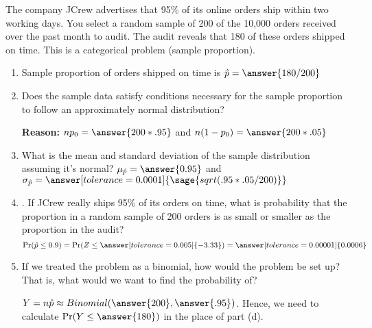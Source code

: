 \documentclass{ximera}
\begin{document}
\begin{problem}
The company JCrew advertises that 95\% of its online orders ship within two working
days. You select a random sample of 200 of the 10,000 orders received over the past month to
audit. The audit reveals that 180 of these orders shipped on time. This is a categorical problem
(sample proportion).
\begin{enumerate} 
    \item Sample proportion of orders shipped on time is $\hat p=\answer{180/200}$

    \item Does the sample data satisfy conditions necessary for the sample proportion to follow an
approximately normal distribution?
\begin{multipleChoice}
\end{multipleChoice}
{\bf Reason:} $np_0=\answer{200*.95}$
and $n(1-p_0)=\answer{200*.05}$
    
    \item What is the mean and standard deviation of the sample distribution assuming it's normal?
    $\mu_{\hat p}=\answer{0.95}$ and $\sigma_{\hat p}=\answer[tolerance=0.0001]{\sage{sqrt(.95*.05/200)}}$

    \item . If JCrew really ships 95\% of its orders on time, what is probability that the proportion in a
random sample of 200 orders is as small or smaller as the proportion in the audit?
$$\Pr(\hat p \leq 0.9)=\Pr(Z\leq \answer[tolerance=0.005]{-3.33})=\answer[tolerance=0.00001]{0.0006}$$
\item If we treated the problem as a binomial, how would the problem be set up? That is, what
would we want to find the probability of?
\begin{explanation}
$Y=n\hat p \approx Binomial(\answer{200},\answer{.95})$.
Hence, we need to calculate $\Pr(Y\leq \answer{180})$ in the place of part (d). 
\end{explanation}
\end{enumerate}
\end{problem}
\end{document}
